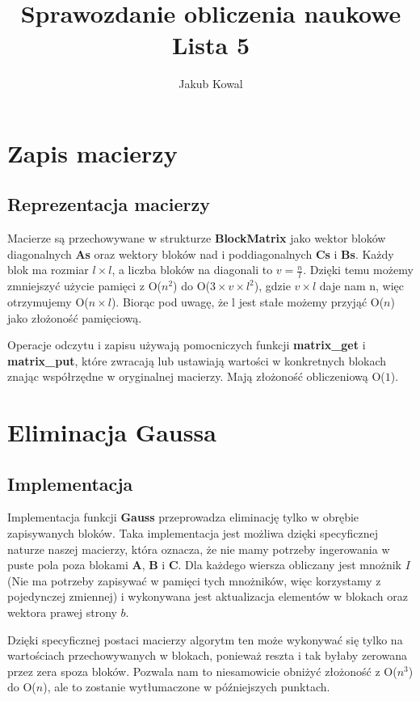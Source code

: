 \documentclass{article}
\title{Sprawozdanie obliczenia naukowe\\Lista 5}
\author{Jakub Kowal}
\date{}
\begin{document}
\maketitle

\section*{Zapis macierzy}
\subsection*{Reprezentacja macierzy}

Macierze są przechowywane w strukturze \textbf{BlockMatrix} jako wektor bloków diagonalnych \textbf{As} oraz wektory bloków nad i poddiagonalnych \textbf{Cs} i \textbf{Bs}. Każdy blok ma rozmiar $l\times l$, a liczba bloków na diagonali to $v=\frac{n}{l}$. Dzięki temu możemy zmniejszyć użycie pamięci z O($n^{2}$) do O($3\times v\times l^{2}$), gdzie $v\times l$ daje nam n, więc otrzymujemy O($n\times l$). Biorąc pod uwagę, że l jest stałe możemy przyjąć O($n$) jako złożoność pamięciową.

Operacje odczytu i zapisu używają pomocniczych funkcji \textbf{matrix\_get} i \textbf{matrix\_put}, które zwracają lub ustawiają wartości w konkretnych blokach znając współrzędne w oryginalnej macierzy. Mają złożoność obliczeniową O($1$).

\section*{Eliminacja Gaussa}
\subsection*{Implementacja}

Implementacja funkcji \textbf{Gauss} przeprowadza eliminację tylko w obrębie zapisywanych bloków. Taka implementacja jest możliwa dzięki specyficznej naturze naszej macierzy, która oznacza, że nie mamy potrzeby ingerowania w puste pola poza blokami \textbf{A}, \textbf{B} i \textbf{C}. Dla każdego wiersza obliczany jest mnożnik $I$ (Nie ma potrzeby zapisywać w pamięci tych mnożników, więc korzystamy z pojedynczej zmiennej) i wykonywana jest aktualizacja elementów w blokach oraz wektora prawej strony $b$.

Dzięki specyficznej postaci macierzy algorytm ten może wykonywać się tylko na wartościach przechowywanych w blokach, ponieważ reszta i tak byłaby zerowana przez zera spoza bloków. Pozwala nam to niesamowicie obniżyć złożoność z O($n^{3}$) do O($n$), ale to zostanie wytłumaczone w późniejszych punktach.
\end{document}
